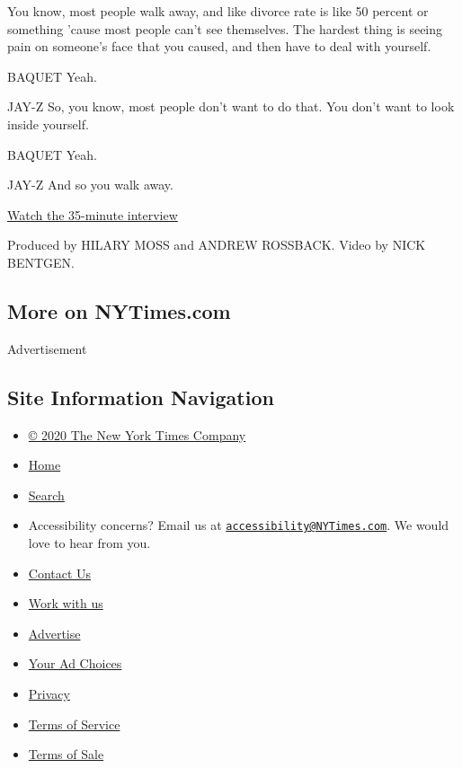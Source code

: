 You know, most people walk away, and like divorce rate is like 50
percent or something 'cause most people can't see themselves. The
hardest thing is seeing pain on someone's face that you caused, and then
have to deal with yourself.

BAQUET Yeah.

JAY-Z So, you know, most people don't want to do that. You don't want to
look inside yourself.

BAQUET Yeah.

JAY-Z And so you walk away.

\href{http://www.nytimes3xbfgragh.onion/video/t-magazine/100000005574909/jayz-interview.html}{Watch
the 35-minute interview}

Produced by HILARY MOSS and ANDREW ROSSBACK. Video by NICK BENTGEN.

\hypertarget{more-on-nytimescom}{%
\subsection{More on NYTimes.com}\label{more-on-nytimescom}}

Advertisement

\hypertarget{site-information-navigation}{%
\subsection{Site Information
Navigation}\label{site-information-navigation}}

\begin{itemize}
\tightlist
\item
  \href{https://help.nytimes3xbfgragh.onion/hc/en-us/articles/115014792127-Copyright-notice}{©
  2020 The New York Times Company}
\item
  \href{https://www.nytimes3xbfgragh.onion}{Home}
\item
  \href{https://www.nytimes3xbfgragh.onion/search/}{Search}
\item
  Accessibility concerns? Email us at
  \href{mailto:accessibility@NYTimes.com}{\nolinkurl{accessibility@NYTimes.com}}.
  We would love to hear from you.
\item
  \href{https://help.nytimes3xbfgragh.onion/hc/en-us/articles/115015385887-Contact-Us}{Contact
  Us}
\item
  \href{https://www.nytco.com/careers/}{Work with us}
\item
  \href{https://nytmediakit.com/}{Advertise}
\item
  \href{https://help.nytimes3xbfgragh.onion/hc/en-us/articles/115014892108-Privacy-policy\#pp}{Your
  Ad Choices}
\item
  \href{https://help.nytimes3xbfgragh.onion/hc/en-us/articles/115014892108-Privacy-policy}{Privacy}
\item
  \href{https://help.nytimes3xbfgragh.onion/hc/en-us/articles/115014893428-Terms-of-service}{Terms
  of Service}
\item
  \href{https://help.nytimes3xbfgragh.onion/hc/en-us/articles/115014893968-Terms-of-sale}{Terms
  of Sale}
\end{itemize}

